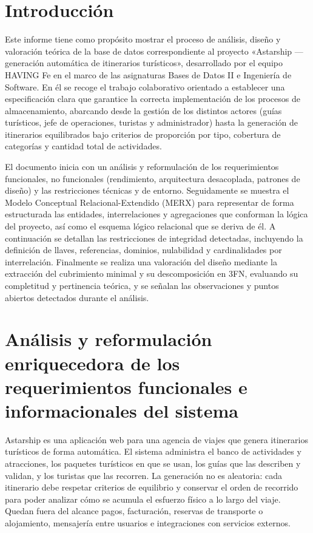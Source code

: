 \documentclass[11pt,a4paper]{article}
\begin{document}
\section{Introducción}
Este informe tiene como propósito mostrar el proceso de análisis, diseño y valoración teórica de la base de datos correspondiente al proyecto «Astarship — generación automática de itinerarios turísticos», desarrollado por el equipo HAVING Fe en el marco de las asignaturas Bases de Datos II e Ingeniería de Software. En él se recoge el trabajo colaborativo orientado a establecer una especificación clara que garantice la correcta implementación de los procesos de almacenamiento, abarcando desde la gestión de los distintos actores (guías turísticos, jefe de operaciones, turistas y administrador) hasta la generación de itinerarios equilibrados bajo criterios de proporción por tipo, cobertura de categorías y cantidad total de actividades.

El documento inicia con un análisis y reformulación de los requerimientos funcionales, no funcionales (rendimiento, arquitectura desacoplada, patrones de diseño) y las restricciones técnicas y de entorno. Seguidamente se muestra el Modelo Conceptual Relacional-Extendido (MERX) para representar de forma estructurada las entidades, interrelaciones y agregaciones que conforman la lógica del proyecto, así como el esquema lógico relacional que se deriva de él. A continuación se detallan las restricciones de integridad detectadas, incluyendo la definición de llaves, referencias, dominios, nulabilidad y cardinalidades por interrelación. Finalmente se realiza una valoración del diseño mediante la extracción del cubrimiento minimal y su descomposición en 3FN, evaluando su completitud y pertinencia teórica, y se señalan las observaciones y puntos abiertos detectados durante el análisis.

\section{Análisis y reformulación enriquecedora de los requerimientos funcionales e informacionales del sistema}
Astarship es una aplicación web para una agencia de viajes que genera itinerarios turísticos de forma automática. El sistema administra el banco de actividades y atracciones, los paquetes turísticos en que se usan, los guías que las describen y validan, y los turistas que las recorren. La generación no es aleatoria: cada itinerario debe respetar criterios de equilibrio y conservar el orden de recorrido para poder analizar cómo se acumula el esfuerzo físico a lo largo del viaje. Quedan fuera del alcance pagos, facturación, reservas de transporte o alojamiento, mensajería entre usuarios e integraciones con servicios externos.
\end{document}
